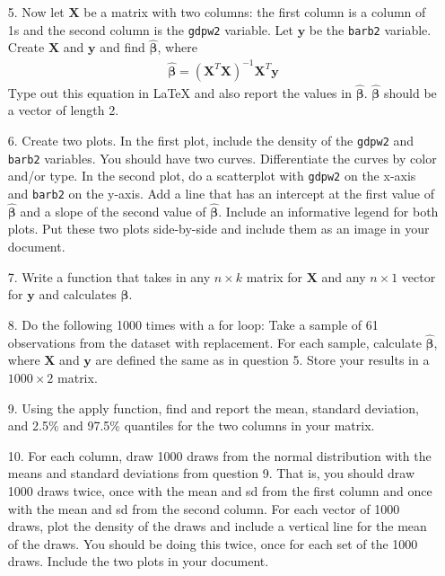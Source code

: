 \documentclass[handout]{beamer}
\begin{document}
\begin{frame}[fragile]
\begin{enumerate}
\item[5.] Now let $\mathbf{X}$ be a matrix with two columns: the first column is a column of 1s and the second column is the {\tt gdpw2} variable.  Let $\mathbf{y}$ be the {\tt barb2} variable.  Create $\mathbf{X}$ and $\mathbf{y}$ and find $\bm{\hat{\beta}}$, where
\begin{eqnarray*}
 \bm{\hat{\beta}} = (\mathbf{X}^T\mathbf{X})^{-1} \mathbf{X}^T\mathbf{y}
\end{eqnarray*}
Type out this equation in \LaTeX\hspace{1pt} and also report the values in $\bm{\hat{\beta}}$.  $\bm{\hat{\beta}}$ should be a vector of length 2.  
\item[6.] Create two plots.  In the first plot, include the density of the {\tt gdpw2} and {\tt barb2} variables.  You should have two curves.  Differentiate the curves by color and/or type.  In the second plot, do a scatterplot with {\tt gdpw2} on the x-axis and {\tt barb2} on the y-axis.  Add a line that has an intercept at the first value of $\bm{\hat{\beta}}$ and a slope of the second value of $\bm{\hat{\beta}}$.  Include an informative legend for both plots.  Put these two plots side-by-side and include them as an image in your document.
\end{enumerate}
\end{frame}

\begin{frame}
\begin{itemize}
\item[7.] Write a function that takes in any $n \times k$ matrix for $\mathbf{X}$ and any $n \times 1$ vector for $\mathbf{y}$ and calculates $\bm{\hat{\beta}}$.
\item[8.] Do the following 1000 times with a for loop: Take a sample of 61 observations from the dataset with replacement.  For each sample, calculate $\bm{\hat{\beta}}$, where $\mathbf{X}$ and $\mathbf{y}$ are defined the same as in question 5.  Store your results in a $1000 \times 2$ matrix.
\item[9.]  Using the apply function, find and report the mean, standard deviation, and 2.5\% and 97.5\% quantiles for the two columns in your matrix.
\item[10.] For each column, draw 1000 draws from the normal distribution with the means and standard deviations from question 9.  That is, you should draw 1000 draws twice, once with the mean and sd from the first column and once with the mean and sd from the second column.  For each vector of 1000 draws, plot the density of the draws and include a vertical line for the mean of the draws.  You should be doing this twice, once for each set of the 1000 draws.  Include the two plots in your document.
\end{itemize}
\end{frame}
\end{document}
